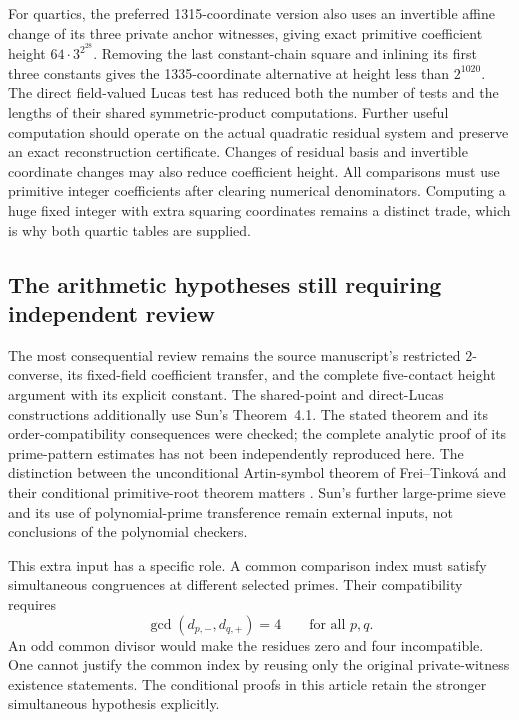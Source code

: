 \documentclass[11pt]{article}
\theoremstyle{definition}
\begin{document}
For quartics, the preferred 1315-coordinate version also uses an
invertible affine change of its three private anchor witnesses, giving
exact primitive coefficient height $64\cdot3^{2^{28}}$. Removing the
last constant-chain square and inlining its first three constants gives
the 1335-coordinate alternative at height less than $2^{1020}$.
The direct field-valued Lucas test has reduced both the
number of tests and the lengths of their shared symmetric-product
computations. Further useful computation should operate on the actual
quadratic residual system and preserve an exact reconstruction
certificate. Changes of residual basis and invertible coordinate
changes may also reduce coefficient height. All comparisons must use
primitive integer coefficients after clearing numerical denominators.
Computing a huge fixed integer with extra squaring coordinates remains
a distinct trade, which is why both quartic tables are supplied.

\subsection{The arithmetic hypotheses still requiring independent review}

The most consequential review remains the source manuscript's
restricted $2$-converse, its fixed-field coefficient transfer, and
the complete five-contact height argument with its explicit constant.
The shared-point and direct-Lucas constructions additionally use
Sun's Theorem~4.1. The stated theorem and its order-compatibility
consequences were checked; the complete analytic proof of its
prime-pattern estimates has not been independently reproduced here.
The distinction between the unconditional Artin-symbol theorem of
Frei--Tinkov\'a and their conditional primitive-root theorem matters
\cite{FreiTinkova2025}. Sun's further large-prime sieve and its use
of polynomial-prime transference \cite{TaoZiegler2018} remain external
inputs, not conclusions of the polynomial checkers.

This extra input has a specific role. A common comparison index must
satisfy simultaneous congruences at different selected primes. Their
compatibility requires
\[
                    \gcd(d_{p,-},d_{q,+})=4
                         \qquad\text{for all }p,q.
\]
An odd common divisor would make the residues zero and four
incompatible. One cannot justify the common index by reusing only the
original private-witness existence statements. The conditional proofs
in this article retain the stronger simultaneous hypothesis explicitly.
\end{document}
